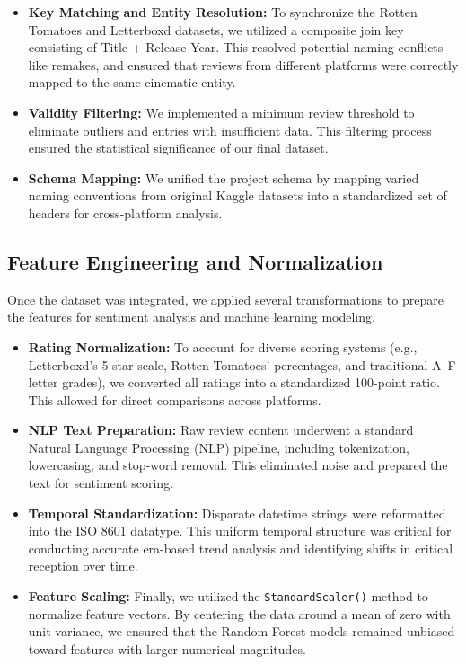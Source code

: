 \documentclass[conference]{IEEEtran}
\begin{document}
\begin{itemize}
  \item \textbf{Key Matching and Entity Resolution:} To synchronize the Rotten Tomatoes and Letterboxd datasets, we utilized a composite join key consisting of Title + Release Year. This resolved potential naming conflicts like remakes, and ensured that reviews from different platforms were correctly mapped to the same cinematic entity.
  \item \textbf{Validity Filtering:} We implemented a minimum review threshold to eliminate outliers and entries with insufficient data. This filtering process ensured the statistical significance of our final dataset.
  \item \textbf{Schema Mapping:} We unified the project schema by mapping varied naming conventions from original Kaggle datasets into a standardized set of headers for cross-platform analysis.
\end{itemize}

\subsection{Feature Engineering and Normalization}
Once the dataset was integrated, we applied several transformations to prepare the features for sentiment analysis and machine learning modeling.

\begin{itemize}
  \item \textbf{Rating Normalization:} To account for diverse scoring systems (e.g., Letterboxd’s 5-star scale, Rotten Tomatoes’ percentages, and traditional A–F letter grades), we converted all ratings into a standardized 100-point ratio. This allowed for direct comparisons across platforms.
  \item \textbf{NLP Text Preparation:} Raw review content underwent a standard Natural Language Processing (NLP) pipeline, including tokenization, lowercasing, and stop-word removal. This eliminated noise and prepared the text for sentiment scoring.
  \item \textbf{Temporal Standardization:} Disparate datetime strings were reformatted into the ISO 8601 datatype. This uniform temporal structure was critical for conducting accurate era-based trend analysis and identifying shifts in critical reception over time.
  \item \textbf{Feature Scaling:} Finally, we utilized the \texttt{StandardScaler()} method to normalize feature vectors. By centering the data around a mean of zero with unit variance, we ensured that the Random Forest models remained unbiased toward features with larger numerical magnitudes.
\end{itemize}
\end{document}
